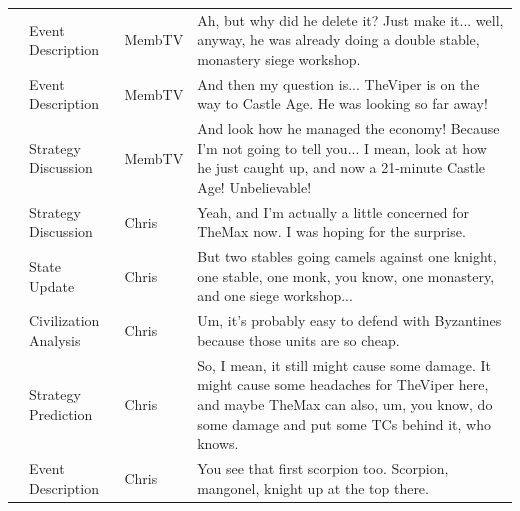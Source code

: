 {\begin{longtable}{@{}>{\theAppRow}r|L{2.3cm}L{1.0cm}U{11.55cm}@{}}
    & Event Description     & MembTV       & Ah, but why did he delete it? Just make it... well, anyway, he was already doing a double stable, monastery siege workshop.                                                                                                                                      \\
    & Event Description     & MembTV       & And then my question is... TheViper is on the way to Castle Age. He was looking so far away!                                                                                                                                                                     \\
    & Strategy Discussion   & MembTV       & And look how he managed the economy! Because I'm not going to tell you... I mean, look at how he just caught up, and now a 21-minute Castle Age! Unbelievable!                                                                                                   \\
    & Strategy Discussion   & Chris        & Yeah, and I'm actually a little concerned for TheMax now. I was hoping for the surprise.                                                                                                                                                                         \\
    & State Update          & Chris        & But two stables going camels against one knight, one stable, one monk, you know, one monastery, and one siege workshop...                                                                                                                                        \\
    & Civilization Analysis & Chris        & Um, it's probably easy to defend with Byzantines because those units are so cheap.                                                                                                                                                                               \\
    & Strategy Prediction   & Chris        & So, I mean, it still might cause some damage. It might cause some headaches for TheViper here, and maybe TheMax can also, um, you know, do some damage and put some TCs behind it, who knows.                                                                    \\
    & Event Description     & Chris        & You see that first scorpion too. Scorpion, mangonel, knight up at the top there.                                                                                                                                                                                 \\

\end{longtable}}
